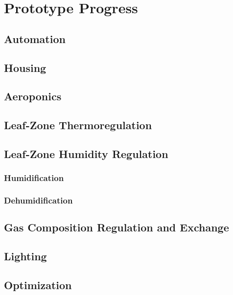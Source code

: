 \documentclass{../tex/report}
\begin{document}

\section{Prototype Progress}

\subsection{Automation}
\subsection{Housing}
\subsection{Aeroponics}
\subsection{Leaf-Zone Thermoregulation}
\subsection{Leaf-Zone Humidity Regulation}
\subsubsection{Humidification}
\subsubsection{Dehumidification}
\subsection{Gas Composition Regulation and Exchange}
\subsection{Lighting}
\subsection{Optimization}

\clearpage



\end{document}
